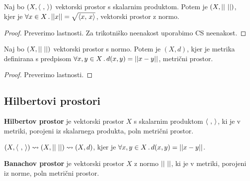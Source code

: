 \begin{trditev}
    Naj bo \((X, \langle \ , \,  \rangle)\) vektorski prostor s skalarnim produktom. Potem je \((X, ||\ ||)\), kjer je \(\forall x \in X \,.\, ||x|| = \sqrt{\langle x, \, x \rangle}\), vektorski prostor z normo.
\end{trditev}

\begin{proof}
    Preverimo lastnosti. Za trikotniško neenakost uporabimo CS neenakost.
\end{proof}

\begin{trditev}
    Naj bo \((X, ||\ ||)\) vektorski prostor s normo. Potem je \((X, d)\), kjer je metrika definirana s predpisom \(\forall x, y \in X \,.\,d(x,y) = ||x - y||\), metrični prostor.
\end{trditev}

\begin{proof}
    Preverimo lastnosti. 
\end{proof}

\subsection{Hilbertovi prostori}
\begin{definicija}
    \textbf{Hilbertov prostor} je vektorski prostor \(X\) s skalarnim produktom \(\langle \ , \,  \rangle\), ki je v metriki, porojeni iz skalarnega produkta, poln metrični prostor.
\end{definicija}

\begin{opomba}
    \((X, \langle \ , \,  \rangle) \leadsto (X, ||\ ||) \leadsto (X, d)\), kjer je \(\forall x, y \in X \,.\,d(x,y) = ||x - y||\).
\end{opomba}

\begin{opomba}
    \textbf{Banachov prostor} je vektorski prostor \(X\) z normo \(||\ ||\), ki je v metriki, porojeni iz norme, poln metrični prostor.
\end{opomba}

